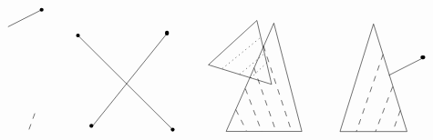 \documentclass{article}
\begin{document}
\[\begin{tikzpicture}[x=0.75pt,y=0.75pt,yscale=-1,xscale=1]
\draw  [dash pattern={on 4.5pt off 4.5pt}]  (219,191) -- (211.11,213.11) ;
\draw    (191,100) -- (226.11,82.11) ;
\draw    (264,109) -- (364,209) ;
\draw    (278,206) -- (357.11,107.11) ;
\draw   (468.85,96.11) -- (498.11,210) -- (419,210) -- cycle ;
\draw  [dash pattern={on 4.5pt off 4.5pt}]  (429.11,187.11) -- (440.11,209.11) ;
\draw  [dash pattern={on 4.5pt off 4.5pt}]  (439.11,165.11) -- (456.11,210.11) ;
\draw  [dash pattern={on 4.5pt off 4.5pt}]  (448.11,143.11) -- (471.11,210.11) ;
\draw  [dash pattern={on 4.5pt off 4.5pt}]  (458,120) -- (487.11,209.11) ;
\draw   (451.13,93.36) -- (466.49,160.48) -- (400.45,139.97) -- cycle ;
\draw  [dash pattern={on 0.84pt off 2.51pt}]  (444.56,154.06) -- (462.11,137.11) ;
\draw  [dash pattern={on 0.84pt off 2.51pt}]  (433,150) -- (459.11,128.11) ;
\draw  [dash pattern={on 0.84pt off 2.51pt}]  (415,144) -- (455.11,111.11) ;
\draw   (573,97) -- (608,210.11) -- (538,210.11) -- cycle ;
\draw  [dash pattern={on 4.5pt off 4.5pt}]  (583,129) -- (555.11,210.11) ;
\draw  [dash pattern={on 4.5pt off 4.5pt}]  (593,163) -- (575.11,210.11) ;
\draw  [dash pattern={on 4.5pt off 4.5pt}]  (601,188) -- (593.11,210.11) ;
\draw    (589,151) -- (624.11,133.11) ;
\draw  [line width=3] [line join = round][line cap = round] (278.11,204.11) .. controls (278.11,204.11) and (278.11,204.11) .. (278.11,204.11) ;
\draw  [line width=3] [line join = round][line cap = round] (357.11,106.11) .. controls (357.11,106.44) and (357.11,106.78) .. (357.11,107.11) ;
\draw  [line width=3] [line join = round][line cap = round] (363.11,208.11) .. controls (363.11,208.11) and (363.11,208.11) .. (363.11,208.11) ;
\draw  [line width=3] [line join = round][line cap = round] (264.11,109.11) .. controls (264.11,109.11) and (264.11,109.11) .. (264.11,109.11) ;
\draw  [line width=3] [line join = round][line cap = round] (226.11,82.11) .. controls (226.11,82.11) and (226.11,82.11) .. (226.11,82.11) ;
\draw  [line width=3] [line join = round][line cap = round] (624.11,132.11) .. controls (624.44,132.11) and (624.78,132.11) .. (625.11,132.11) ;


\end{tikzpicture}\]
\end{document}
